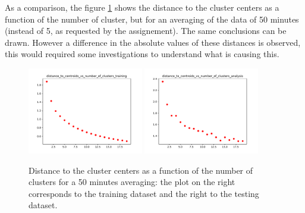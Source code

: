 \documentclass[11pt]{amsart}
\begin{document}
As a comparison, the figure \ref{fig:distance_to_centroids3} shows the distance to the cluster centers as a function of the number of cluster, but for an averaging of the data of 50 minutes (instead of 5, as requested by the assignement).
The same conclusions can be drawn.
However a difference in the absolute values of these distances is observed, this would required some investigations to understand what is causing this.
\begin{figure}
    \includegraphics[width=0.45\textwidth]{../plots/distance_to_centroids_vs_number_of_clusters_training.pdf}
    \includegraphics[width=0.45\textwidth]{../plots/distance_to_centroids_vs_number_of_clusters_analysis.pdf}
    \caption{\label{fig:distance_to_centroids3} Distance to the cluster centers as a function of the number of clusters for a 50 minutes averaging: the plot on the right corresponds to the training dataset and the right to the testing dataset.}
\end{figure}
\end{document}
